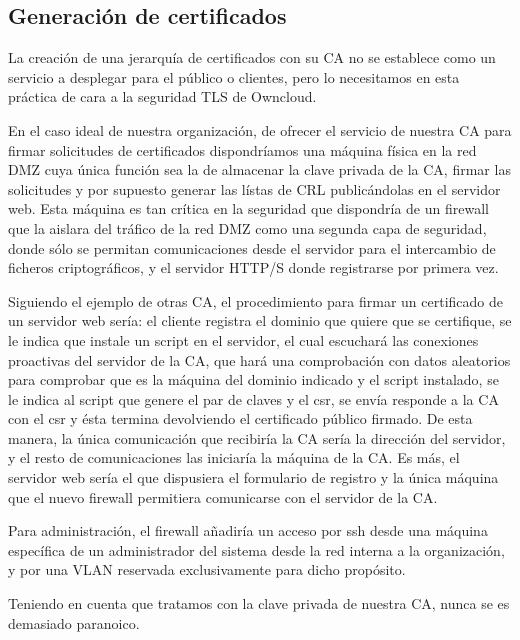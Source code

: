 \documentclass[]{article}
\begin{document}


\subsection{Generación de certificados}

La creación de una jerarquía de certificados con su CA no se establece como un servicio a desplegar para el público o clientes, pero lo necesitamos en esta práctica de cara a la seguridad TLS de Owncloud.

En el caso ideal de nuestra organización, de ofrecer el servicio de nuestra CA para firmar solicitudes de certificados dispondríamos una máquina física en la red DMZ cuya única función sea la de almacenar la clave privada de la CA, firmar las solicitudes y por supuesto generar las lístas de CRL publicándolas en el servidor web. Esta máquina es tan crítica en la seguridad que dispondría de un firewall que la aislara del tráfico de la red DMZ como una segunda capa de seguridad, donde sólo se permitan comunicaciones desde el servidor para el intercambio de ficheros criptográficos, y el servidor HTTP/S donde registrarse por primera vez.

Siguiendo el ejemplo de otras CA, el procedimiento para firmar un certificado de un servidor web sería: el cliente registra el dominio que quiere que se certifique, se le indica que instale un script en el servidor, el cual escuchará las conexiones proactivas del servidor de la CA, que hará una comprobación con datos aleatorios para comprobar que es la máquina del dominio indicado y el script instalado, se le indica al script que genere el par de claves y el csr, se envía responde a la CA con el csr y ésta termina devolviendo el certificado público firmado. De esta manera, la única comunicación que recibiría la CA sería la dirección del servidor, y el resto de comunicaciones las iniciaría la máquina de la CA. Es más, el servidor web sería el que dispusiera el formulario de registro y la única máquina que el nuevo firewall permitiera comunicarse con el servidor de la CA.

Para administración, el firewall añadiría un acceso por ssh desde una máquina específica de un administrador del sistema desde la red interna a la organización, y por una VLAN reservada exclusivamente para dicho propósito.

Teniendo en cuenta que tratamos con la clave privada de nuestra CA, nunca se es demasiado paranoico.


\hfill
\end{document}
